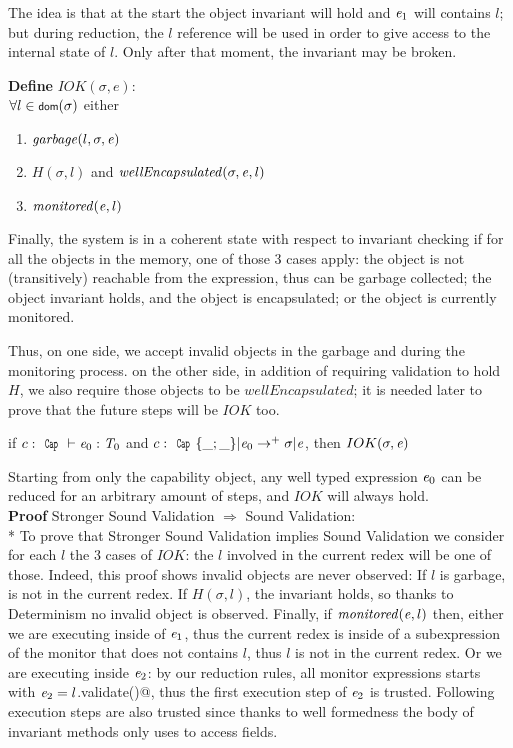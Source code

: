 The idea is that at the start the object invariant will hold and ${\mathit{e}}_1$ will contains $l$;
but during reduction, the $l$ reference will be used in order to
give access to the internal state of $l$. Only after that moment, the invariant may be broken.


\noindent\textbf{Define} $IOK(\sigma,e)$:\\
${}_{}$\quad\quad  $\forall l\in\dom(\sigma)$
  either
\begin{enumerate}
   \item $\mathit{garbage}(l,\sigma,\e)$
   \item $H(\sigma,l)$ and $\mathit{wellEncapsulated}(\sigma,\e,l)$
   \item $\mathit{monitored}({\mathit{e}},l)$
\end{enumerate}

\noindent
Finally, the system is in a coherent state with respect to invariant checking 
if for all the objects in the memory, one of those 3 cases apply:
the object is not (transitively) reachable from the expression, thus can be garbage collected;
the object invariant holds, and the object is encapsulated;
or the object is currently monitored.

Thus, on one side, we accept invalid objects in the garbage and during the monitoring process.
on the other side, in addition of requiring validation to hold $H$, we
also require those objects to be $\mathit{wellEncapsulated}$;
it is needed later to prove that the future steps will be $IOK$ too.


\begin{Theorem}
if $c:\Kw{Cap}\vdash \e_0: \T_0$ and
$c:\Kw{Cap}\{\_;\_\}|\e_0\rightarrow^+ \sigma|\e$, then
$IOK(\sigma,\e)$
\end{Theorem}
\noindent Starting from only the capability object,
any well typed expression ${\mathit{e}}_0$ can be reduced for an arbitrary amount of steps,
and $IOK$ will always hold.
\\
\textbf{Proof }Stronger Sound Validation $\Rightarrow$ Sound Validation:\\*
\noindent To prove that Stronger Sound Validation implies Sound Validation
we consider for each $l$ the 3 cases of $IOK$: the $l$ involved in the current redex
will be one of those.
Indeed, this proof shows invalid objects are never observed:
If $l$ is garbage, is not in the current redex.
If $H(\sigma,l)$, the invariant holds, so thanks to Determinism
no invalid object is observed.
Finally, if $\mathit{monitored}({\mathit{e}},l)$
then, either we are executing inside of ${\mathit{e}}_1$, thus
the current redex is inside of a subexpression of the monitor that does not contains $l$, thus
$l$ is not in the current redex.
Or we are executing inside ${\mathit{e}}_2$:
by our reduction rules, all monitor expressions starts with 
${\mathit{e}}_2=l$\Q@.validate()@, thus the first execution step
of ${\mathit{e}}_2$ is trusted.
Following execution steps are also trusted since thanks
to well formedness the body of invariant methods only
uses \Q@this@ to access fields.


